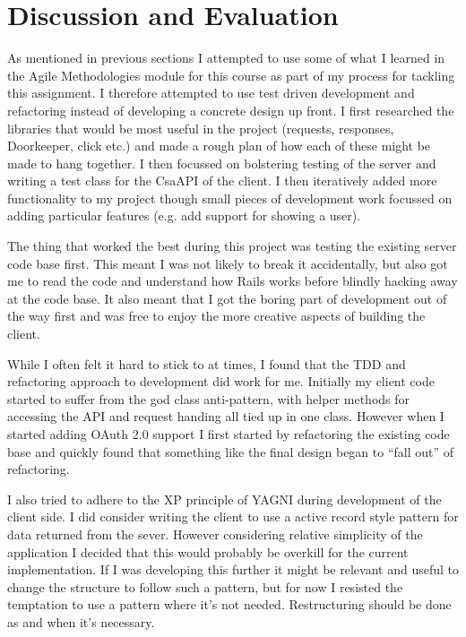 \documentclass[paper=a4, fontsize=11pt]{scrartcl}	%
\numberwithin{equation}{section}															%
\numberwithin{figure}{section}																%
\numberwithin{table}{section}
\begin{document}
\section{Discussion and Evaluation}
\label{sec:evaluation}
As mentioned in previous sections I attempted to use some of what I learned in the Agile Methodologies module for this course as part of my process for tackling this assignment. I therefore attempted to use test driven development and refactoring instead of developing a concrete design up front. I first researched the libraries that would be most useful in the project (requests, responses, Doorkeeper, click etc.) and made a rough plan of how each of these might be made to hang together. I then focussed on bolstering  testing of the server and writing a test class for the CsaAPI of the client. I then iteratively added more functionality to my project though small pieces of development work focussed on adding particular features (e.g. add support for showing a user).

The thing that worked the best during this project was testing the existing server code base first. This meant I was not likely to break it accidentally, but also got me to read the code and understand how Rails works before blindly hacking away at the code base. It also meant that I got the boring part of development out of the way first and was free to enjoy the more creative aspects of building the client.

While I often felt it hard to stick to at times, I found that the TDD and refactoring approach to development did work for me. Initially my client code started to suffer from the god class anti-pattern, with helper methods for accessing the API and request handing all tied up in one class. However when I started adding OAuth 2.0 support I first started by refactoring the existing code base and quickly found that something like the final design began to ``fall out'' of refactoring. 

I also tried to adhere to the XP principle of YAGNI during development of the client side. I did consider writing the client to use a active record style pattern for data returned from the sever. However considering relative simplicity of the application I decided that this would probably be overkill for the current implementation. If I was developing this further it might be relevant and useful to change the structure to follow such a pattern, but for now I resisted the temptation to use a pattern where it's not needed. Restructuring should be done as and when it's necessary.
\end{document}

